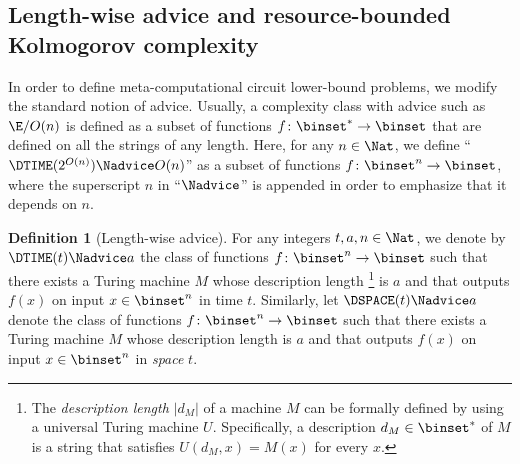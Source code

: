 \documentclass[11pt]{article}
\numberwithin{equation}{section}
\theoremstyle{definition}
\newtheorem{definition}[theorem]{Definition}
\theoremstyle{plain}
\begin{document}
\subsection{Length-wise advice and resource-bounded Kolmogorov complexity}
\label{section_MCLPdef}

In order to define meta-computational circuit lower-bound problems,
we modify the standard notion of advice.
Usually, a complexity class with advice such as $\E / O(n)$ is defined as a subset of functions $f \colon \binset^* \to \binset$ that are defined on all the strings of any length.
Here,
for any $n \in \Nat$,
we define
``$\DTIME(2^{O(n)}) \Nadvice O(n)$'' as a subset of functions $f \colon \binset^n \to \binset$,
where the superscript $n$ in ``$\Nadvice$'' is appended in order to emphasize that it depends on $n$.
\begin{definition}
  [Length-wise advice]
  \label{def_AdviceLengthwise}
  For any integers $t, a, n \in \Nat$,
  we denote by $\DTIME(t) \Nadvice a$ the class of functions $f \colon \binset^n \to \binset$
  such that
  there exists a Turing machine $M$ whose description length%
  \footnote{%
    The \emph{description length} $|d_M|$ of a machine $M$ can be formally defined by using a universal Turing machine $U$.  Specifically, a description $d_M \in \binset^*$ of $M$
    is a string that satisfies $U(d_M, x) = M(x)$ for every $x$.}
  is $a$
  and
  that outputs $f(x)$ on input $x \in \binset^n$ in time $t$.
  Similarly, let $\DSPACE(t) \Nadvice a$ denote the class of functions $f \colon \binset^n \to \binset$
  such that
  there exists a Turing machine $M$ whose description length
  is $a$
  and
  that outputs $f(x)$ on input $x \in \binset^n$ in \emph{space} $t$.
\end{definition}

%
%
%
%
%
%
%
%
%
%
%
\end{document}
